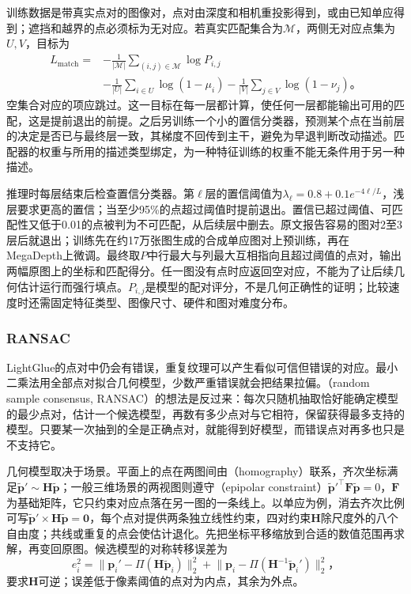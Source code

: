 训练数据是带真实点对的图像对，点对由深度和相机重投影得到，或由已知单应得到；遮挡和越界的点必须标为无对应。若真实匹配集合为$\mathcal M$，两侧无对应点集为$U,V$，目标为
\begin{equation}
 \begin{aligned}
 L_{\mathrm{match}}={}&-\frac1{|\mathcal M|}
 \sum_{(i,j)\in\mathcal M}\log P_{i,j}\\
 &-\frac1{|U|}\sum_{i\in U}\log(1-\mu_i)
 -\frac1{|V|}\sum_{j\in V}\log(1-\nu_j)\text{。}
 \end{aligned}
 \label{eq:vision-lightglue-training-process}
\end{equation}
空集合对应的项应跳过。这一目标在每一层都计算，使任何一层都能输出可用的匹配，这是提前退出的前提。之后另训练一个小的置信分类器，预测某个点在当前层的决定是否已与最终层一致，其梯度不回传到主干，避免为早退判断改动描述。匹配器的权重与所用的描述类型绑定，为一种特征训练的权重不能无条件用于另一种描述。

推理时每层结束后检查置信分类器。第$\ell$层的置信阈值为$\lambda_\ell=0.8+0.1e^{-4\ell/L}$，浅层要求更高的置信；当至少95\%的点超过阈值时提前退出。置信已超过阈值、可匹配性又低于0.01的点被判为不可匹配，从后续层中删去。原文报告容易的图对2至3层后就退出；训练先在约17万张图生成的合成单应图对上预训练，再在MegaDepth上微调。最终取$P$中行最大与列最大互相指向且超过阈值的点对，输出两幅原图上的坐标和匹配得分。任一图没有点时应返回空对应，不能为了让后续几何估计运行而强行填点。$P_{i,j}$是模型的配对评分，不是几何正确性的证明；比较速度时还需固定特征类型、图像尺寸、硬件和图对难度分布。

\subsubsection{RANSAC}
\label{sec:vision-recognition-ransac}

LightGlue的点对中仍会有错误，重复纹理可以产生看似可信但错误的对应。最小二乘法用全部点对拟合几何模型，少数严重错误就会把结果拉偏。（random sample consensus, RANSAC）的想法是反过来：每次只随机抽取恰好能确定模型的最少点对，估计一个候选模型，再数有多少点对与它相符，保留获得最多支持的模型。只要某一次抽到的全是正确点对，就能得到好模型，而错误点对再多也只是不支持它。

几何模型取决于场景。平面上的点在两图间由（homography）联系，齐次坐标满足$\tilde{\bm{p}}'\sim\bm{H}\tilde{\bm{p}}$；一般三维场景的两视图则遵守（epipolar constraint）$\tilde{\bm{p}}'^\top\bm{F}\tilde{\bm{p}}=0$，$\bm{F}$为基础矩阵，它只约束对应点落在另一图的一条线上。以单应为例，消去齐次比例可写$\tilde{\bm p}'\times\bm H\tilde{\bm p}=\bm0$，每个点对提供两条独立线性约束，四对约束$\bm H$除尺度外的八个自由度；共线或重复的点会使估计退化。先把坐标平移缩放到合适的数值范围再求解，再变回原图。候选模型的对称转移误差为
\[
 e_i^2=\lVert\bm p_i'-\Pi(\bm H\tilde{\bm p}_i)\rVert_2^2
       +\lVert\bm p_i-\Pi(\bm H^{-1}\tilde{\bm p}_i')\rVert_2^2\text{，}
\]
要求$\bm H$可逆；误差低于像素阈值的点对为内点，其余为外点。

